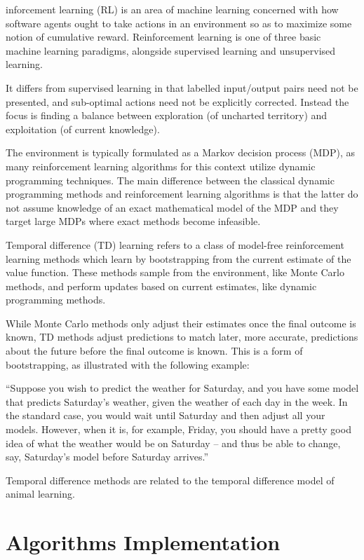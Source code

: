 \documentclass[journal]{IEEEtran}
\begin{document}
inforcement learning (RL) is an area of machine learning concerned with how software agents ought to take actions in an environment so as to maximize some notion of cumulative reward. Reinforcement learning is one of three basic machine learning paradigms, alongside supervised learning and unsupervised learning.

It differs from supervised learning in that labelled input/output pairs need not be presented, and sub-optimal actions need not be explicitly corrected. Instead the focus is finding a balance between exploration (of uncharted territory) and exploitation (of current knowledge).

The environment is typically formulated as a Markov decision process (MDP), as many reinforcement learning algorithms for this context utilize dynamic programming techniques. The main difference between the classical dynamic programming methods and reinforcement learning algorithms is that the latter do not assume knowledge of an exact mathematical model of the MDP and they target large MDPs where exact methods become infeasible.

Temporal difference (TD) learning refers to a class of model-free reinforcement learning methods which learn by bootstrapping from the current estimate of the value function. These methods sample from the environment, like Monte Carlo methods, and perform updates based on current estimates, like dynamic programming methods.

While Monte Carlo methods only adjust their estimates once the final outcome is known, TD methods adjust predictions to match later, more accurate, predictions about the future before the final outcome is known. This is a form of bootstrapping, as illustrated with the following example:

``Suppose you wish to predict the weather for Saturday, and you have some model that predicts Saturday's weather, given the weather of each day in the week. In the standard case, you would wait until Saturday and then adjust all your models. However, when it is, for example, Friday, you should have a pretty good idea of what the weather would be on Saturday – and thus be able to change, say, Saturday's model before Saturday arrives.''

Temporal difference methods are related to the temporal difference model of animal learning.

\section{Algorithms Implementation}
\end{document}
